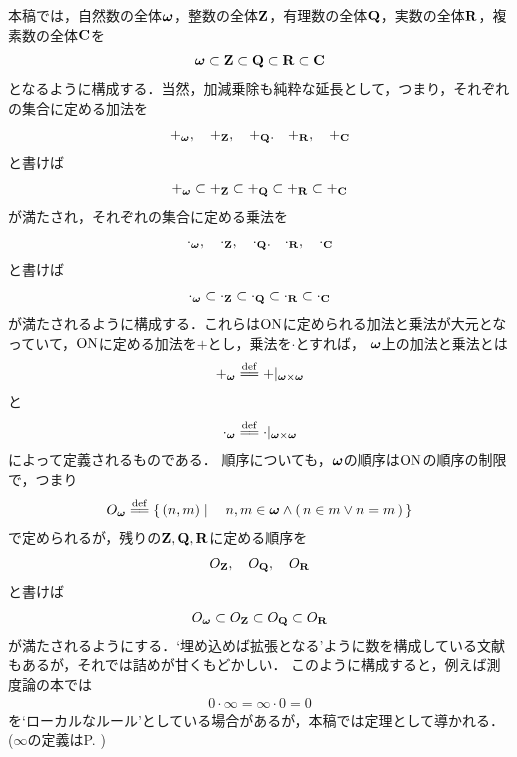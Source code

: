 本稿では，自然数の全体${\boldsymbol \omega}$，整数の全体$\mathbf{Z}$，有理数の全体$\mathbf{Q}$，実数の全体$\mathbf{R}$，複素数の全体$\mathbf{C}$を
\begin{align}
	{\boldsymbol \omega} \subset \mathbf{Z} \subset \mathbf{Q} \subset \mathbf{R} \subset \mathbf{C}
\end{align}
となるように構成する．当然，加減乗除も純粋な延長として，つまり，それぞれの集合に定める加法を
\begin{align}
	+_{\boldsymbol \omega},\quad +_{\mathbf{Z}},\quad +_{\mathbf{Q}}.\quad +_{\mathbf{R}},\quad +_{\mathbf{C}}
\end{align}
と書けば
\begin{align}
	+_{\boldsymbol \omega} \subset +_{\mathbf{Z}} \subset +_{\mathbf{Q}} \subset +_{\mathbf{R}} \subset +_{\mathbf{C}}
\end{align}
が満たされ，それぞれの集合に定める乗法を
\begin{align}
	\cdot_{\boldsymbol \omega},\quad \cdot_{\mathbf{Z}},\quad \cdot_{\mathbf{Q}}.\quad \cdot_{\mathbf{R}},\quad \cdot_{\mathbf{C}}
\end{align}
と書けば
\begin{align}
	\cdot_{\boldsymbol \omega} \subset \cdot_{\mathbf{Z}} \subset \cdot_{\mathbf{Q}} \subset \cdot_{\mathbf{R}} \subset \cdot_{\mathbf{C}}
\end{align}
が満たされるように構成する．これらは$\mathrm{ON}$に定められる加法と乗法が大元となっていて，$\mathrm{ON}$に定める加法を$+$とし，乗法を$\cdot$とすれば，
${\boldsymbol \omega}$上の加法と乗法とは
\begin{align}
	+_\Natural \defeq +|_{\Natural \times \Natural}
\end{align}
と
\begin{align}
	\cdot_\Natural \defeq \cdot|_{\Natural \times \Natural}
\end{align}
によって定義されるものである．
順序についても，${\boldsymbol \omega}$の順序は$\mathrm{ON}$の順序の制限で，つまり
\begin{align}
	O_\Natural \defeq \Set{(n,m)}{n,m \in \Natural \wedge (\, n \in m \vee n = m\, )}
\end{align}
で定められるが，残りの$\mathbf{Z},\mathbf{Q},\mathbf{R}$に定める順序を
\begin{align}
	O_{\mathbf{Z}},\quad O_{\mathbf{Q}},\quad O_{\mathbf{R}}
\end{align}
と書けば
\begin{align}
	O_{\boldsymbol \omega} \subset O_{\mathbf{Z}} \subset O_{\mathbf{Q}} \subset O_{\mathbf{R}}
\end{align}
が満たされるようにする．`埋め込めば拡張となる'ように数を構成している文献もあるが，それでは詰めが甘くもどかしい．
このように構成すると，例えば測度論の本では
\begin{align}
	0 \cdot \infty = \infty \cdot 0 = 0
\end{align}
を`ローカルなルール'としている場合があるが，本稿では定理として導かれる．
($\infty$の定義はP. \pageref{def:infinity})


